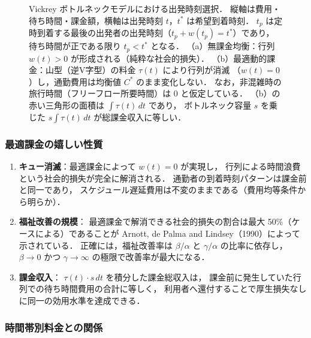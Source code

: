 \begin{figure}[hbtp]
  \centering
  
  \caption{Vickrey ボトルネックモデルにおける出発時刻選択．
           縦軸は費用・待ち時間・課金額，横軸は出発時刻 $t$，$t^*$ は希望到着時刻．
           $t_p$ は定時到着する最後の出発者の出発時刻（$t_p + w(t_p) = t^*$）であり，
           待ち時間が正である限り $t_p < t^*$ となる．
           （a）無課金均衡：行列 $w(t) > 0$ が形成される（純粋な社会的損失）．
           （b）最適動的課金：山型（逆V字型）の料金 $\tau(t)$ により行列が消滅
           （$w(t) = 0$）し，通勤費用は均衡値 $C^*$ のまま変化しない．
           なお，非混雑時の旅行時間（フリーフロー所要時間）は $0$ と仮定している．
           （b）の赤い三角形の面積は $\int\tau(t)\,dt$ であり，
           ボトルネック容量 $s$ を乗じた $s\int\tau(t)\,dt$ が総課金収入に等しい．}
  \label{fig:vickrey-bottleneck}
\end{figure}

\subsubsection*{最適課金の嬉しい性質}

\begin{enumerate}
  \item
    \textbf{キュー消滅}：最適課金によって $w(t)=0$ が実現し，
    行列による時間浪費という社会的損失が完全に解消される．
    通勤者の到着時刻パターンは課金前と同一であり，
    スケジュール遅延費用は不変のままである（費用均等条件から明らか）．

  \item
    \textbf{福祉改善の規模}：
    最適課金で解消できる社会的損失の割合は最大 50\%（ケースによる）であることが
    Arnott, de Palma and Lindsey（1990）によって示されている\cite{ArnottdePalmaLindsey1990}．
    正確には，福祉改善率は $\beta/\alpha$ と $\gamma/\alpha$ の比率に依存し，
    $\beta \to 0$ かつ $\gamma \to \infty$ の極限で改善率が最大になる．

  \item
    \textbf{課金収入}：
    $\tau(t) \cdot s\,dt$ を積分した課金総収入は，
    課金前に発生していた行列での待ち時間費用の合計に等しく，
    利用者へ還付することで厚生損失なしに同一の効用水準を達成できる．
\end{enumerate}

\subsubsection*{時間帯別料金との関係}

